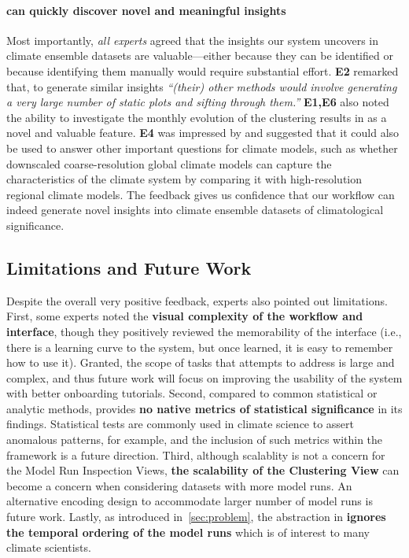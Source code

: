 \paragraph{\ClimateSOM can quickly discover novel and meaningful insights} Most importantly, \textit{all experts} agreed that the insights our system uncovers in climate ensemble datasets are valuable—either because they can be identified or because identifying them manually would require substantial effort.
%
%
\textbf{E2} remarked that, to generate similar insights \textit{``(their) other methods would involve generating a very large number of static plots and sifting through them.''}
%
\textbf{E1,E6} also noted the ability to investigate the monthly evolution of the clustering results in \ClimateSOM as a novel and valuable feature.
%
\textbf{E4} was impressed by \ClimateSOM and suggested that it could also be used to answer other important questions for climate models, such as whether downscaled coarse-resolution global climate models can capture the characteristics of the climate system by comparing it with high-resolution regional climate models.
%
The feedback gives us confidence that our workflow can indeed generate novel insights into climate ensemble datasets of climatological significance.


\subsection{Limitations and Future Work}
Despite the overall very positive feedback, experts also pointed out limitations.
%
First, some experts noted the \textbf{visual complexity of the workflow and interface}, though they positively reviewed the memorability of the interface (i.e., there is a learning curve to the system, but once learned, it is easy to remember how to use it).
%
Granted, the scope of tasks that \ClimateSOM attempts to address is large and complex, and thus future work will focus on improving the usability of the system with better onboarding tutorials.
%
Second, compared to common statistical or analytic methods, \ClimateSOM provides \textbf{no native metrics of statistical significance} in its findings.
%
Statistical tests are commonly used in climate science to assert anomalous patterns, for example, and the inclusion of such metrics within the \ClimateSOM framework is a future direction.
%
Third, although scalablity is not a concern for the Model Run Inspection Views, \textbf{the scalability of the Clustering View} can become a concern when considering datasets with more model runs.
%
An alternative encoding design to accommodate larger number of model runs is future work. 
%
Lastly, as introduced in~\cref{sec:problem}, the abstraction in \ClimateSOM \textbf{ignores the temporal ordering of the model runs} which is of interest to many climate scientists.

